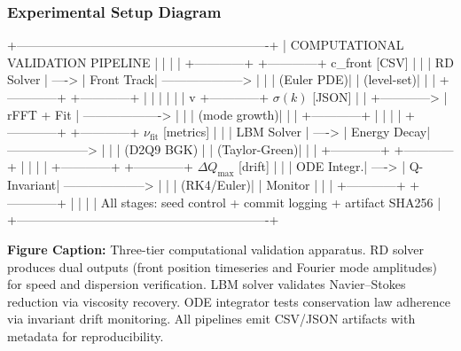 \documentclass[
]{article}
\newenvironment{Shaded}{}{}
\newcommand{\NormalTok}[1]{#1}
\begin{document}
\hypertarget{experimental-setup-diagram}{%
\subsubsection{Experimental Setup
Diagram}\label{experimental-setup-diagram}}

\begin{Shaded}
\begin{Highlighting}[]
\NormalTok{+-------------------------------------------------------------+}
\NormalTok{|  COMPUTATIONAL VALIDATION PIPELINE                       |}
\NormalTok{|                                                             |}
\NormalTok{|  +------------+      +------------+      c\_front [CSV]     |}
\NormalTok{|  | RD Solver  | ----> | Front Track| --------------------> |}
\NormalTok{|  | (Euler PDE)|      | (level-set)|                       |}
\NormalTok{|  +------------+      +------------+                       |}
\NormalTok{|         |                                             |    |}
\NormalTok{|         v              +------------+      $\sigma(k)$ [JSON]   |}
\NormalTok{|         +------------> | rFFT + Fit | -------------------> |}
\NormalTok{|                        | (mode growth)|                   |}
\NormalTok{|                        +------------+                      |}
\NormalTok{|                                                             |}
\NormalTok{|  +------------+      +------------+      $\nu_{\text{fit}}$ [metrics]   |}
\NormalTok{|  | LBM Solver | ----> | Energy Decay| --------------------> |}
\NormalTok{|  | (D2Q9 BGK) |      | (Taylor-Green)|                     |}
\NormalTok{|  +------------+      +------------+                       |}
\NormalTok{|                                                             |}
\NormalTok{|  +------------+      +------------+      $\Delta Q_{\max}$ [drift]    |}
\NormalTok{|  | ODE Integr.| ----> | Q-Invariant| --------------------> |}
\NormalTok{|  | (RK4/Euler)|      | Monitor    |                      |}
\NormalTok{|  +------------+      +------------+                       |}
\NormalTok{|                                                             |}
\NormalTok{|  All stages: seed control + commit logging + artifact SHA256 |}
\NormalTok{+-------------------------------------------------------------+}
\end{Highlighting}
\end{Shaded}

\textbf{Figure Caption:} Three-tier computational validation apparatus.
RD solver produces dual outputs (front position timeseries and Fourier
mode amplitudes) for speed and dispersion verification. LBM solver
validates Navier--Stokes reduction via viscosity recovery. ODE
integrator tests conservation law adherence via invariant drift
monitoring. All pipelines emit CSV/JSON artifacts with metadata for
reproducibility.
\end{document}
